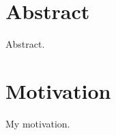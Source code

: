 \section{Abstract}
\label{sec:abstract}
Abstract. \\

\lipsum

\section{Motivation}
\label{sec:motivation}
My motivation. \\

\lipsum